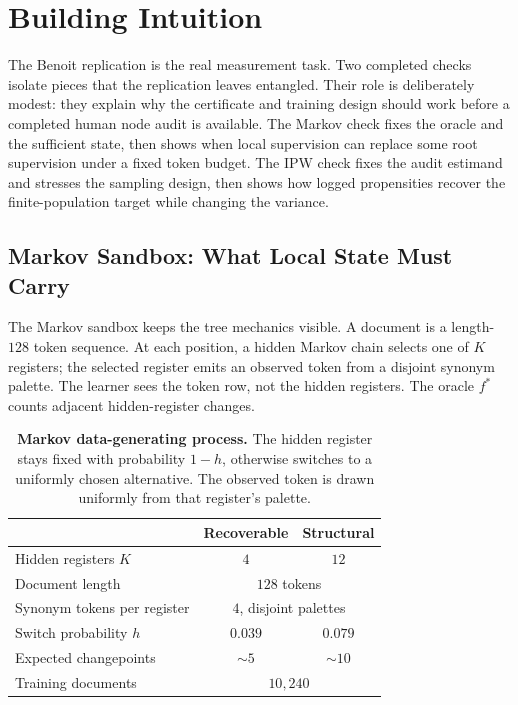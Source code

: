 \section{Building Intuition}
\label{sec:v10-controlled-checks}

The Benoit replication is the real measurement task. Two completed
checks isolate pieces that the replication leaves entangled. Their
role is deliberately modest: they explain why the certificate and
training design should work before a completed human node audit is
available. The Markov check fixes the oracle and the sufficient state,
then shows when local supervision can replace some root supervision
under a fixed token budget. The IPW check fixes the audit estimand and
stresses the sampling design, then shows how logged propensities
recover the finite-population target while changing the variance.

\subsection{Markov Sandbox: What Local State Must Carry}
\label{sec:v10-markov-check}

The Markov sandbox keeps the tree mechanics visible. A document is a
length-\(128\) token sequence. At each position, a hidden Markov chain
selects one of \(K\) registers; the selected register emits an
observed token from a disjoint synonym palette. The learner sees the
token row, not the hidden registers. The oracle \(f^\ast\) counts
adjacent hidden-register changes.

\begin{table}[t]
\centering
\small
\begin{tabular}{@{}lcc@{}}
\toprule
 & Recoverable & Structural \\
\midrule
Hidden registers \(K\) & \(4\) & \(12\) \\
Document length & \multicolumn{2}{c}{\(128\) tokens} \\
Synonym tokens per register & \multicolumn{2}{c}{\(4\), disjoint palettes} \\
Switch probability \(h\) & \(0.039\) & \(0.079\) \\
Expected changepoints & \({\sim}5\) & \({\sim}10\) \\
Training documents & \multicolumn{2}{c}{\(10{,}240\)} \\
\bottomrule
\end{tabular}
\caption{\textbf{Markov data-generating process.} The hidden register
stays fixed with probability \(1-h\), otherwise switches to a uniformly
chosen alternative. The observed token is drawn uniformly from that
register's palette.}
\label{tab:v10-markov-dgp}
\end{table}


